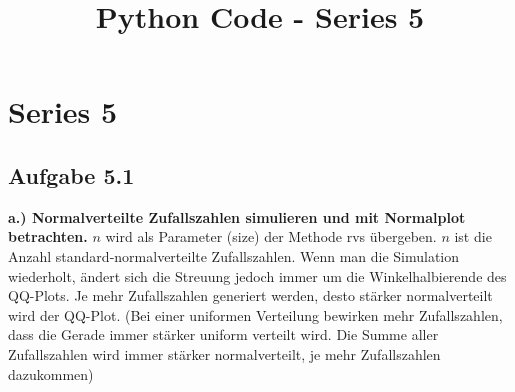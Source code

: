 \documentclass[11pt]{article}
\title{Python Code - Series 5}
\begin{document}
    
    
    \maketitle
    
    

    
    \section{Series 5}\label{series-5}

    \subsection{Aufgabe 5.1}\label{aufgabe-5.1}

    \textbf{a.) Normalverteilte Zufallszahlen simulieren und mit Normalplot
betrachten.} \(n\) wird als Parameter (size) der Methode rvs übergeben.
\(n\) ist die Anzahl standard-normalverteilte Zufallszahlen. Wenn man
die Simulation wiederholt, ändert sich die Streuung jedoch immer um die
Winkelhalbierende des QQ-Plots. Je mehr Zufallszahlen generiert werden,
desto stärker normalverteilt wird der QQ-Plot. (Bei einer uniformen
Verteilung bewirken mehr Zufallszahlen, dass die Gerade immer stärker
uniform verteilt wird. Die Summe aller Zufallszahlen wird immer stärker
normalverteilt, je mehr Zufallszahlen dazukommen)
\end{document}
